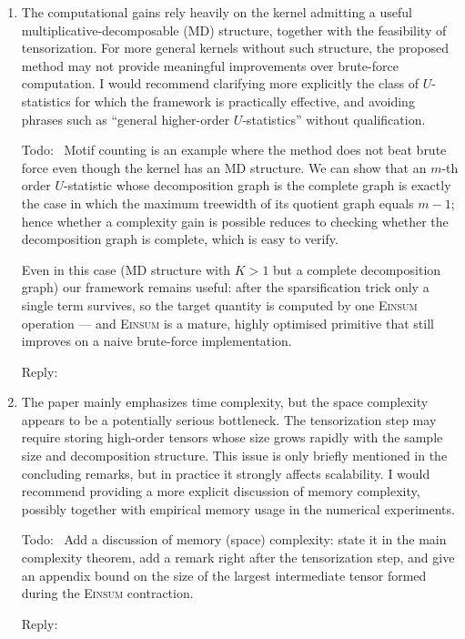 \documentclass[12pt]{article}
\newenvironment{reply}{\par\smallskip\noindent\color{blue}Reply:\ \ignorespaces}{\par}
\newenvironment{todo}{\par\smallskip\noindent\color{red}Todo:\ \ignorespaces}{\par}
\theoremstyle{plain}
\theoremstyle{definition}
\def\Einsum{\textsc{Einsum}}
\begin{document}
\begin{enumerate}

\item The computational gains rely heavily on the kernel admitting a useful multiplicative-decomposable (MD) structure, together with the feasibility of tensorization. For more general kernels without such structure, the proposed method may not provide meaningful improvements over brute-force computation. I would recommend clarifying more explicitly the class of $U$-statistics for which the framework is practically effective, and avoiding phrases such as ``general higher-order $U$-statistics'' without qualification.
\begin{todo}
    Motif counting is an example where the method does not beat brute force even though the kernel has an MD structure. We can show that an $m$-th order $U$-statistic whose decomposition graph is the complete graph is exactly the case in which the maximum treewidth of its quotient graph equals $m-1$; hence whether a complexity gain is possible reduces to checking whether the decomposition graph is complete, which is easy to verify.

    Even in this case (MD structure with $K > 1$ but a complete decomposition graph) our framework remains useful: after the sparsification trick only a single term survives, so the target quantity is computed by one \Einsum{} operation --- and \Einsum{} is a mature, highly optimised primitive that still improves on a naive brute-force implementation.
\end{todo}
\begin{reply}      \end{reply}

\item The paper mainly emphasizes time complexity, but the space complexity appears to be a potentially serious bottleneck. The tensorization step may require storing high-order tensors whose size grows rapidly with the sample size and decomposition structure. This issue is only briefly mentioned in the concluding remarks, but in practice it strongly affects scalability. I would recommend providing a more explicit discussion of memory complexity, possibly together with empirical memory usage in the numerical experiments.
\begin{todo}
    Add a discussion of memory (space) complexity: state it in the main complexity theorem, add a remark right after the tensorization step, and give an appendix bound on the size of the largest intermediate tensor formed during the \Einsum{} contraction.
\end{todo}
\begin{reply}      \end{reply}


\end{enumerate}
\end{document}
